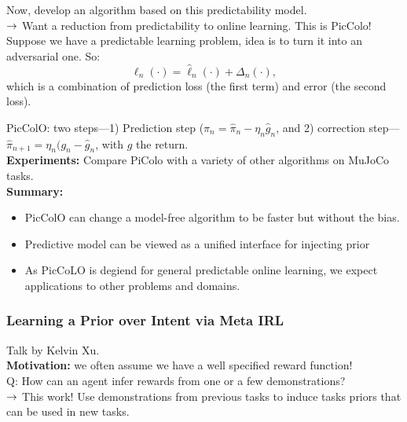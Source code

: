 Now, develop an algorithm based on this predictability model. \\

$\rightarrow$ Want a reduction from predictability to online learning. This is PicColo! \\

Suppose we have a predictable learning problem, idea is to turn it into an adversarial one. So:
\[
\ell_n(\cdot) = \hat{\ell}_n(\cdot) + \Delta_n(\cdot),
\]
which is a combination of prediction loss (the first term) and error (the second loss). 

PicColO: two steps---1) Prediction step ($\pi_n = \hat{\pi}_n - \eta_{n}\hat{g}_n$, and 2) correction step---$\hat{\pi}_{n+1} = \eta_n(g_n - \hat{g}_n$, with $g$ the return.\\

{\bf Experiments:} Compare PiColo with a variety of other algorithms on MuJoCo tasks. \\

{\bf Summary:}
\begin{itemize}
    \item PicColO can change a model-free algorithm to be faster but without the bias.
    \item Predictive model can be viewed as a unified interface for injecting prior
    \item As PicCoLO is degiend for general predictable online learning, we expect applications to other problems and domains.
\end{itemize}


\spacerule

\subsubsection{Learning a Prior over Intent via Meta IRL~\cite{xu2018learning}}

Talk by Kelvin Xu. \\

{\bf Motivation:} we often assume we have a well specified reward function! \\

Q: How can an agent infer rewards from one or a few demonstrations? \\

$\rightarrow$ This work! Use demonstrations from previous tasks to induce tasks priors that can be used in new tasks. \\

